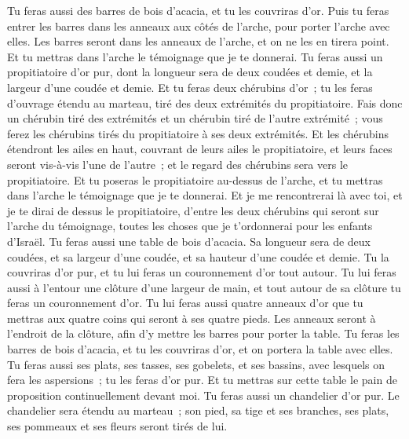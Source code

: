 \begin{multicols}{2}
Tu feras aussi des barres de bois d'acacia, et tu les couvriras d'or.
Puis tu feras entrer les barres dans les anneaux aux côtés de l'arche, pour porter l'arche avec elles.
Les barres seront dans les anneaux de l'arche, et on ne les en tirera point.
Et tu mettras dans l'arche le témoignage que je te donnerai.
Tu feras aussi un propitiatoire d'or pur, dont la longueur sera de deux coudées et demie, et la largeur d'une coudée et demie.
Et tu feras deux chérubins d'or~; tu les feras d'ouvrage étendu au marteau, tiré des deux extrémités du propitiatoire.
Fais donc un chérubin tiré des extrémités et un chérubin tiré de l'autre extrémité~; vous ferez les chérubins tirés du propitiatoire à ses deux extrémités.
Et les chérubins étendront les ailes en haut, couvrant de leurs ailes le propitiatoire, et leurs faces seront vis-à-vis l'une de l'autre~; et le regard des chérubins sera vers le propitiatoire.
Et tu poseras le propitiatoire au-dessus de l'arche, et tu mettras dans l'arche le témoignage que je te donnerai.
Et je me rencontrerai là avec toi, et je te dirai de dessus le propitiatoire, d'entre les deux chérubins qui seront sur l'arche du témoignage, toutes les choses que je t'ordonnerai pour les enfants d'Israël.
Tu feras aussi une table de bois d'acacia. Sa longueur sera de deux coudées, et sa largeur d'une coudée, et sa hauteur d'une coudée et demie.
Tu la couvriras d'or pur, et tu lui feras un couronnement d'or tout autour.
Tu lui feras aussi à l'entour une clôture d'une largeur de main, et tout autour de sa clôture tu feras un couronnement d'or.
Tu lui feras aussi quatre anneaux d'or que tu mettras aux quatre coins qui seront à ses quatre pieds.
Les anneaux seront à l'endroit de la clôture, afin d'y mettre les barres pour porter la table.
Tu feras les barres de bois d'acacia, et tu les couvriras d'or, et on portera la table avec elles.
Tu feras aussi ses plats, ses tasses, ses gobelets, et ses bassins, avec lesquels on fera les aspersions~; tu les feras d'or pur.
Et tu mettras sur cette table le pain de proposition continuellement devant moi.
Tu feras aussi un chandelier d'or pur. Le chandelier sera étendu au marteau~; son pied, sa tige et ses branches, ses plats, ses pommeaux et ses fleurs seront tirés de lui.

\end{multicols}
